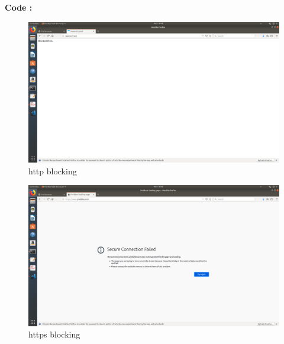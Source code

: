 \documentclass{report}
\begin{document}
    



    \textbf{Code : }\\
    





























    \begin{figure}[h!]
        \includegraphics[width=\linewidth]{http_block.png}
        \caption{http blocking}
    \end{figure}

    \begin{figure}[h!]
        \includegraphics[width=\linewidth]{https_block.png}
        \caption{https blocking}
    \end{figure}
\end{document}
